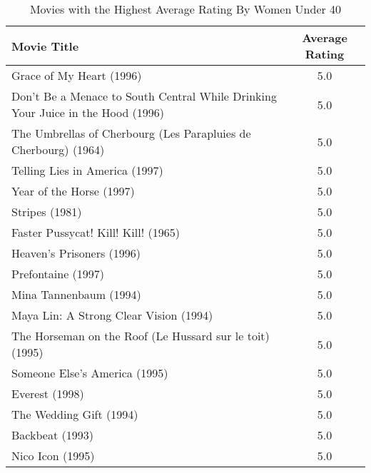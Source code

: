 \documentclass{article}
\begin{document}
\begin{table}[!h]
\centering
\begin{tabular}{l c}
Movie Title & Average Rating \\
\hline
Grace of My Heart (1996) & 5.0 \\
Don't Be a Menace to South Central While Drinking Your Juice in the Hood (1996) & 5.0 \\
The Umbrellas of Cherbourg (Les Parapluies de Cherbourg) (1964) & 5.0 \\
Telling Lies in America (1997) & 5.0 \\
Year of the Horse (1997) & 5.0 \\
Stripes (1981) & 5.0 \\
Faster Pussycat! Kill! Kill! (1965) & 5.0 \\
Heaven's Prisoners (1996) & 5.0 \\
Prefontaine (1997) & 5.0 \\
Mina Tannenbaum (1994) & 5.0 \\
Maya Lin: A Strong Clear Vision (1994) & 5.0 \\
The Horseman on the Roof (Le Hussard sur le toit) (1995) & 5.0 \\
Someone Else's America (1995) & 5.0 \\
Everest (1998) & 5.0 \\
The Wedding Gift (1994) & 5.0 \\
Backbeat (1993) & 5.0 \\
Nico Icon (1995) & 5.0 \\
\hline
\end{tabular}
\caption{Movies with the Highest Average Rating By Women Under 40}
\end{table}
\end{document}
